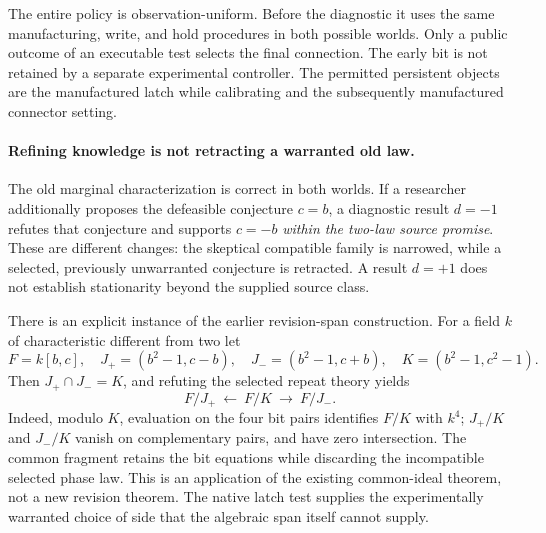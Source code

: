 \documentclass[11pt]{article}
\theoremstyle{definition}
\theoremstyle{remark}
\begin{document}
The entire policy is observation-uniform. Before the diagnostic it uses
the same manufacturing, write, and hold procedures in both possible
worlds. Only a public outcome of an executable test selects the final
connection. The early bit is not retained by a separate experimental
controller. The permitted persistent objects are the manufactured latch
while calibrating and the subsequently manufactured connector setting.

\paragraph{Refining knowledge is not retracting a warranted old law.}
The old marginal characterization is correct in both worlds. If a
researcher additionally proposes the defeasible conjecture $c=b$, a
diagnostic result $d=-1$ refutes that conjecture and supports $c=-b$
\emph{within the two-law source promise}. These are different changes:
the skeptical compatible family is narrowed, while a selected,
previously unwarranted conjecture is retracted. A result $d=+1$ does not
establish stationarity beyond the supplied source class.

There is an explicit instance of the earlier revision-span construction.
For a field $k$ of characteristic different from two let
\[
 F=k[b,c],\quad
 J_+=(b^2-1,c-b),\quad J_-=(b^2-1,c+b),\quad
 K=(b^2-1,c^2-1).
\]
Then $J_+\cap J_-=K$, and refuting the selected repeat theory yields
\[
                 F/J_+\ \longleftarrow\ F/K\ \longrightarrow\ F/J_-.
\]
Indeed, modulo $K$, evaluation on the four bit pairs identifies $F/K$
with $k^4$; $J_+/K$ and $J_-/K$ vanish on complementary pairs, and have
zero intersection. The common fragment retains the bit equations while
discarding the incompatible selected phase law. This is an application
of the existing common-ideal theorem, not a new revision theorem. The
native latch test supplies the experimentally warranted choice of side
that the algebraic span itself cannot supply.
\end{document}
